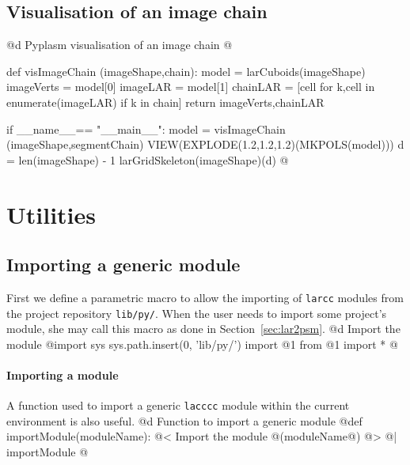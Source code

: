 \documentclass[11pt,oneside]{article}	%
\begin{document}
\subsection{Visualisation of an image chain}

@d Pyplasm visualisation of an image chain
@{def visImageChain (imageShape,chain):
	model = larCuboids(imageShape)
	imageVerts = model[0]
	imageLAR = model[1]
	chainLAR = [cell for k,cell in enumerate(imageLAR) if k in chain]
	return imageVerts,chainLAR
	
if __name__== "__main__":
	model = visImageChain (imageShape,segmentChain)
	VIEW(EXPLODE(1.2,1.2,1.2)(MKPOLS(model)))
	d = len(imageShape) - 1
	larGridSkeleton(imageShape)(d)
@}




\appendix
\section{Utilities}

\subsection{Importing a generic module}
First we define a parametric macro to allow the importing of \texttt{larcc} modules from the project repository \texttt{lib/py/}. When the user needs to import some project's module, she may call this macro as done in Section~\ref{sec:lar2psm}.
@d Import the module
@{import sys
sys.path.insert(0, 'lib/py/')
import @1
from @1 import *
@}

\paragraph{Importing a module} A function used to import a generic \texttt{lacccc} module within the current environment is also useful.
@d Function to import a generic module
@{def importModule(moduleName):
	@< Import the module @(moduleName@) @>
@| importModule @}




\end{document}
